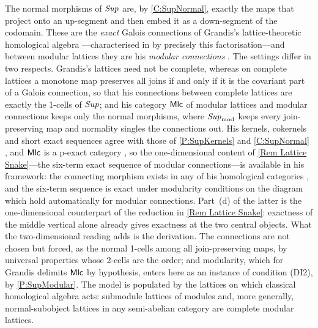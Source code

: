 \begin{remark}
  \label{Rem Lattice Grandis}
  The normal morphisms of \(\mathit{Sup}\) are, by \corx\ref{C:SupNormal}, exactly the maps that project onto an up-segment and then embed it as a down-segment of the codomain. These are the \emph{exact} Galois connections of Grandis's lattice-theoretic homological algebra \cite{Grandis-HA1,Grandis-HA2}---characterised in \cite[1.2.5]{Grandis-HA2} by precisely this factorisation---and between modular lattices they are his \emph{modular connections} \cite[1.2.8]{Grandis-HA2}. The settings differ in two respects. Grandis's lattices need not be complete, whereas on complete lattices a monotone map preserves all joins if and only if it is the covariant part of a Galois connection, so that his connections between complete lattices are exactly the 1-cells of \(\mathit{Sup}\); and his category \(\mathsf{Mlc}\) of modular lattices and modular connections keeps only the normal morphisms, where \(\mathit{Sup}_{\mathrm{mod}}\) keeps every join-preserving map and normality singles the connections out. His kernels, cokernels and short exact sequences agree with those of \prox\ref{P:SupKernels} and \corx\ref{C:SupNormal} \cite[1.2.3]{Grandis-HA2}, and \(\mathsf{Mlc}\) is a p-exact category \cite[1.2.8]{Grandis-HA2}, so the one-dimensional content of \remx\ref{Rem Lattice Snake}---the six-term exact sequence of modular connections---is available in his framework: the connecting morphism exists in any of his homological categories \cite[Lemma~3.3.3]{Grandis-HA2}, and the six-term sequence is exact under modularity conditions on the diagram \cite[Proposition~3.3.4]{Grandis-HA2} which hold automatically for modular connections. Part~(d) of the latter is the one-dimensional counterpart of the reduction in \remx\ref{Rem Lattice Snake}: exactness of the middle vertical alone already gives exactness at the two central objects. What the two-dimensional reading adds is the derivation. The connections are not chosen but forced, as the normal 1-cells among all join-preserving maps, by universal properties whose 2-cells are the order; and modularity, which for Grandis delimits \(\mathsf{Mlc}\) by hypothesis, enters here as an instance of condition \textup{(DI2)}, by \prox\ref{P:SupModular}. The model is populated by the lattices on which classical homological algebra acts: submodule lattices of modules and, more generally, normal-subobject lattices in any semi-abelian category are complete modular lattices.
\end{remark}

